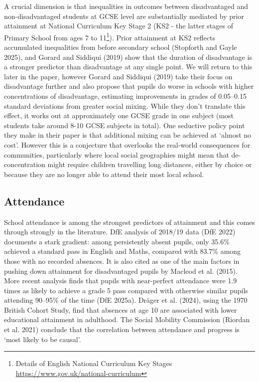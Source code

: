 \documentclass[
  12pt,
  titlepage]{article}
\begin{document}
A crucial dimension is that inequalities in outcomes between
disadvantaged and non-disadvantaged students at GCSE level are
substantially mediated by prior attainment at National Curriculum Key
Stage 2 (KS2 - the latter stages of Primary School from ages 7 to
11\footnote{Details of English National Curriculum Key Stages
  \url{https://www.gov.uk/national-curriculum}}). Prior attainment at
KS2 reflects accumulated inequalities from before secondary school
(Stopforth and Gayle 2025), and Gorard and Siddiqui (2019) show that the
duration of disadvantage is a stronger predictor than disadvantage at
any single point. We will return to this later in the paper, however
Gorard and Siddiqui (2019) take their focus on disadvantage further and
also propose that pupils do worse in schools with higher concentrations
of disadvantage, estimating improvements in grades of 0.05--0.15
standard deviations from greater social mixing. While they don't
translate this effect, it works out at approximately one GCSE grade in
one subject (most students take around 8-10 GCSE subjects in total). One
seductive policy point they make in their paper is that additional
mixing can be achieved at `almost no cost'. However this is a conjecture
that overlooks the real-world consequences for communities, particularly
where local social geographies might mean that de-concentration might
require children travelling long distances, either by choice or because
they are no longer able to attend their most local school.

\subsection{Attendance}\label{attendance}

School attendance is among the strongest predictors of attainment and
this comes through strongly in the literature. DfE analysis of 2018/19
data (DfE 2022) documents a stark gradient: among persistently absent
pupils, only 35.6\% achieved a standard pass in English and Maths,
compared with 83.7\% among those with no recorded absences. It is also
cited as one of the main factors in pushing down attainment for
disadvantaged pupils by Macleod et al. (2015). More recent analysis
finds that pupils with near-perfect attendance were 1.9 times as likely
to achieve a grade 5 pass compared with otherwise similar pupils
attending 90--95\% of the time (DfE 2025a). Dräger et al. (2024), using
the 1970 British Cohort Study, find that absences at age 10 are
associated with lower educational attainment in adulthood. The Social
Mobility Commission (Riordan et al. 2021) conclude that the correlation
between attendance and progress is `most likely to be causal'.
\end{document}
